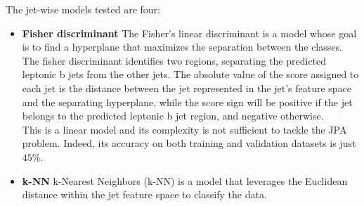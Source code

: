 \newpage
The jet-wise models tested are four: 
\begin{itemize}
    \item \textbf{Fisher discriminant} The Fisher's linear discriminant \cite{FISHER1936THEPROBLEMS} is a model whose goal is to find a hyperplane that maximizes the separation between the classes.\\
    The fisher discriminant identifies two regions, separating the predicted leptonic b jets from the other jets. The absolute value of the score assigned to each jet is the distance between the jet represented in the jet's feature space and the separating hyperplane, while the score sign will be positive if the jet belongs to the predicted leptonic b jet region, and negative otherwise.
    \\
    This is a linear model and its complexity is not sufficient to tackle the JPA problem. Indeed, its accuracy on both training and validation datasets is just $45\%$.
    \item \textbf{k-NN}
    k-Nearest Neighbors (k-NN) \cite{Cunningham2020K-NearestExamples} is a model that leverages the Euclidean distance within the jet feature space to classify the data.
    

\end{itemize}
